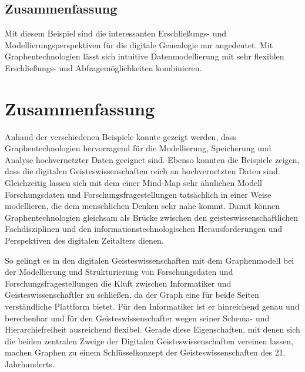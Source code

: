 \documentclass[ngerman,]{scrreprt}
\begin{document}
\hypertarget{zusammenfassung-3}{%
\section{Zusammenfassung}\label{zusammenfassung-3}}

Mit diesem Beispiel sind die interessanten Erschließungs- und Modellierungsperspektiven für die digitale Genealogie nur angedeutet. Mit Graphentechnologien lässt sich intuitive Datenmodellierung mit sehr flexiblen Erschließungs- und Abfragemöglichkeiten kombinieren.

\hypertarget{zusammenfassung-4}{%
\chapter{Zusammenfassung}\label{zusammenfassung-4}}

Anhand der verschiedenen Beispiele konnte gezeigt werden, dass Graphentechnologien hervorragend für die Modellierung, Speicherung und Analyse hochvernetzter Daten geeignet sind. Ebenso konnten die Beispiele zeigen, dass die digitalen Geisteswissenschaften reich an hochvernetzten Daten sind. Gleichzeitig lassen sich mit dem einer Mind-Map sehr ähnlichen Modell Forschungsdaten und Forschungsfragestellungen tatsächlich in einer Weise modellieren, die dem menschlichen Denken sehr nahe kommt. Damit können Graphentechnologien gleichsam als Brücke zwischen den geisteswissenschaftlichen Fachdisziplinen und den informationstechnologischen Herausforderungen und Perspektiven des digitalen Zeitalters dienen.

So gelingt es in den digitalen Geisteswissenschaften mit dem Graphenmodell bei der Modellierung und Strukturierung von Forschungsdaten und Forschungsfragestellungen die Kluft zwischen Informatiker und Geisteswissenschaftler zu schließen, da der Graph eine für beide Seiten verständliche Plattform bietet. Für den Informatiker ist er hinreichend genau und berechenbar und für den Geisteswissenschafter wegen seiner Schema- und Hierarchiefreiheit ausreichend flexibel. Gerade diese Eigenschaften, mit denen sich die beiden zentralen Zweige der Digitalen Geisteswissenschaften vereinen lassen, machen Graphen zu einem Schlüsselkonzept der Geisteswissenschaften des 21. Jahrhunderts.
\end{document}
